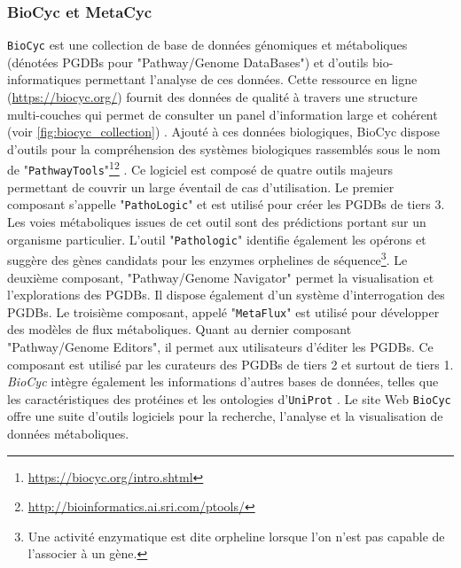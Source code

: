\begin{refsegment}
    \subsubsection{BioCyc et MetaCyc}
    
    \texttt{BioCyc} \cite{caspi2006metacyc,caspi2007metacyc,caspi2008metacyc,caspi2010metacyc,caspi2012metacyc,caspi2013metacyc,caspi2014metacyc,caspi2015metacyc,caspi2016metacyc} est une collection de base de données génomiques et métaboliques (dénotées PGDBs pour "Pathway/Genome DataBases") et d'outils bio-informatiques permettant l'analyse de ces données. Cette ressource en ligne (\url{https://biocyc.org/}) fournit des données de qualité à travers une structure multi-couches qui permet de consulter un panel d'information large et cohérent (voir \cref{fig:biocyc_collection}) . Ajouté à ces données biologiques, BioCyc dispose d'outils pour la compréhension des systèmes biologiques rassemblés sous le nom de  "\texttt{PathwayTools}"\footnote{\url{https://biocyc.org/intro.shtml}}\footnote{\url{http://bioinformatics.ai.sri.com/ptools/}} \cite{karpe2011pathway,karp2015pathway}. Ce logiciel est composé de quatre outils majeurs permettant de couvrir un large éventail de cas d'utilisation. Le premier composant s'appelle "\texttt{PathoLogic}" et est utilisé pour créer les PGDBs de tiers 3. Les voies métaboliques issues de cet outil sont des prédictions portant sur un organisme particulier. L’outil "\texttt{Pathologic}" identifie également les opérons \cite{romero2004using} et suggère des gènes candidats pour les enzymes orphelines de séquence\footnote{Une activité enzymatique est dite orpheline lorsque l'on n'est pas capable de l'associer à un gène.}\cite{Green2004}. Le deuxième composant, "Pathway/Genome Navigator" permet la visualisation et l'explorations des PGDBs. Il dispose également d'un système d'interrogation des PGDBs. Le troisième composant, appelé "\texttt{MetaFlux}" est utilisé pour développer des modèles de flux métaboliques. Quant au dernier composant "Pathway/Genome Editors", il permet aux utilisateurs d'éditer les PGDBs. Ce composant est utilisé par les curateurs des PGDBs de tiers 2 et surtout de tiers 1. \textit{BioCyc} intègre également les informations d'autres bases de données, telles que les caractéristiques des protéines et les ontologies d'\texttt{UniProt} . Le site Web \texttt{BioCyc} offre une suite d'outils logiciels pour la recherche, l'analyse et la visualisation de données métaboliques.
    

\end{refsegment}
